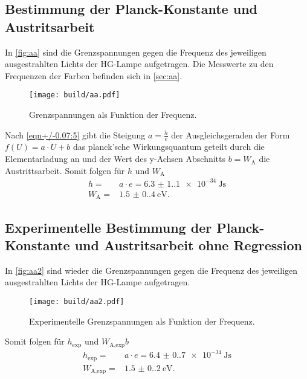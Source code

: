 \subsection{Bestimmung der Planck-Konstante und Austritsarbeit}
\label{sec:planckWa}
\noindent In \autoref{fig:aa} sind die Grenzspannungen gegen die 
Frequenz des jeweiligen ausgestrahlten Lichts der HG-Lampe aufgetragen. Die
Messwerte zu den Frequenzen der Farben befinden sich in \autoref{sec:aa}. 
\begin{figure}[H]
    \centering
    \caption{Grenzspannungen als Funktion der Frequenz.}
    \label{fig:aa}
    \texttt{[image: build/aa.pdf]}
\end{figure} 
\noindent Nach \autoref{eqn+/-0.07:5} gibt die Steigung $a = \frac{h}{e}$ der Ausgleichsgeraden der Form $f(U) = a\cdot U + b$ das planck'sche Wirkungsquantum geteilt durch die 
Elementarladung an und der Wert des y-Achsen Abschnitts $b =  W_\text{A}$
die Austrittsarbeit. Somit folgen für $h$ und $W_\text{A}$
\begin{align}
    h =& a\cdot e = \qty{6.3(1.1)e-34}{\joule\second}\\
    W_\text{A} =& \qty{1.5(0.4)}{\eV}.
\end{align}

\subsection{Experimentelle Bestimmung der Planck-Konstante und Austritsarbeit ohne Regression}
\label{sec:planckWa}
\noindent In \autoref{fig:aa2} sind wieder die Grenzspannungen gegen die 
Frequenz des jeweiligen ausgestrahlten Lichts der HG-Lampe aufgetragen. 
\begin{figure}[H]
    \centering
    \caption{Experimentelle Grenzspannungen als Funktion der Frequenz.}
    \label{fig:aa2}
    \texttt{[image: build/aa2.pdf]}
\end{figure} 
\noindent Somit folgen für $h_\text{exp} $ und $W_\text{A,exp}b$
\begin{align}
    h_\text{exp} =& a\cdot e = \qty{6.4(0.7)e-34}{\joule\second}\\
    W_\text{A,exp} =& \qty{1.5(0.2)}{\eV}.
\end{align}